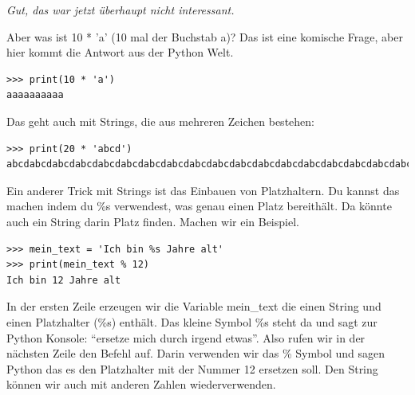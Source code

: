 \noindent
\emph{Gut, das war jetzt überhaupt nicht interessant.}

Aber was ist 10 * 'a' (10 mal der Buchstab a)? Das ist eine komische Frage, aber hier kommt die Antwort aus der Python Welt.

\begin{Verbatim}[frame=single]
>>> print(10 * 'a')
aaaaaaaaaa
\end{Verbatim}

Das geht auch mit Strings, die aus mehreren Zeichen bestehen:

\begin{Verbatim}[frame=single]
>>> print(20 * 'abcd')
abcdabcdabcdabcdabcdabcdabcdabcdabcdabcdabcdabcdabcdabcdabcdabcdabcdabcdabcdabcd
\end{Verbatim}

Ein anderer Trick mit Strings ist das Einbauen von Platzhaltern. Du kannst das machen indem du \%s verwendest, was genau einen Platz bereithält. Da könnte auch ein String darin Platz finden. Machen wir ein Beispiel.

\begin{Verbatim}[frame=single]
>>> mein_text = 'Ich bin %s Jahre alt'
>>> print(mein_text % 12)
Ich bin 12 Jahre alt
\end{Verbatim}

In der ersten Zeile erzeugen wir die Variable mein\_text die einen String und einen Platzhalter (\%s) enthält. Das kleine Symbol \%s steht da und sagt zur Python Konsole: ``ersetze mich durch irgend etwas''. Also rufen wir in der nächsten Zeile den  Befehl auf. Darin verwenden wir das \% Symbol und sagen Python das es den Platzhalter mit der Nummer 12 ersetzen soll. Den String können wir auch mit anderen Zahlen wiederverwenden.

